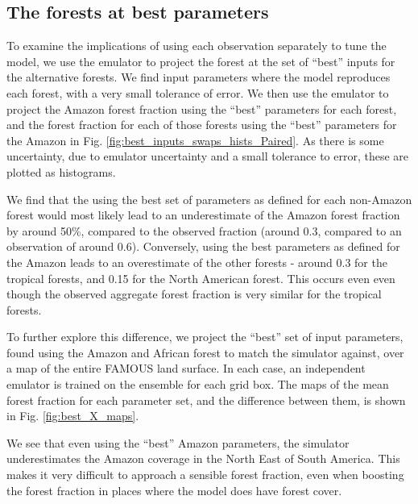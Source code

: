 \documentclass[esd, manuscript]{copernicus}
\begin{document}


\subsection{The forests at best parameters}\label{ssec:bestparameters}
To examine the implications of using each observation separately to tune the model, we use the emulator to project the forest at the set of ``best'' inputs for the alternative forests. We find input parameters where the model reproduces each forest, with a very small tolerance of error. We then use the emulator to project the Amazon forest fraction using the ``best'' parameters for each forest, and the forest fraction for each of those forests using the ``best'' parameters for the Amazon in Fig. \ref{fig:best_inputs_swaps_hists_Paired}. As there is some uncertainty, due to emulator uncertainty and a small tolerance to error, these are plotted as histograms.

We find that the using the best set of parameters as defined for each non-Amazon forest would most likely lead to an underestimate of the Amazon forest fraction by around 50\%, compared to the observed fraction (around 0.3, compared to an observation of around 0.6). Conversely, using the best parameters as defined for the Amazon leads to an overestimate of the other forests - around 0.3 for the tropical forests, and 0.15 for the North American forest. This occurs even even though the observed aggregate forest fraction is very similar for the tropical forests.


To further explore this difference, we project the ``best'' set of input parameters, found using the Amazon and African forest to match the simulator against, over a map of the entire FAMOUS land surface. In each case, an independent emulator is trained on the ensemble for each grid box. The maps of the mean forest fraction for each parameter set, and the difference between them, is shown in Fig.  \ref{fig:best_X_maps}.


We see that even using the ``best'' Amazon parameters, the simulator underestimates the Amazon coverage in the North East of South America. This makes it very difficult to approach a sensible forest fraction, even when boosting the forest fraction in places where the model does have forest cover.
\end{document}
